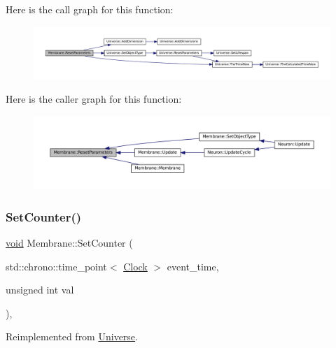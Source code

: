Here is the call graph for this function\+:\nopagebreak
\begin{figure}[H]
\begin{center}
\leavevmode
\includegraphics[width=350pt]{class_membrane_a9c49462cf63495381a52e2defc80b1e4_cgraph}
\end{center}
\end{figure}
Here is the caller graph for this function\+:\nopagebreak
\begin{figure}[H]
\begin{center}
\leavevmode
\includegraphics[width=350pt]{class_membrane_a9c49462cf63495381a52e2defc80b1e4_icgraph}
\end{center}
\end{figure}
\mbox{\label{class_membrane_a4bff43b38d7046867f220392a39cc272}} 
\subsubsection{\texorpdfstring{Set\+Counter()}{SetCounter()}}
{\footnotesize\ttfamily \mbox{\hyperlink{glad_8h_a950fc91edb4504f62f1c577bf4727c29}{void}} Membrane\+::\+Set\+Counter (\begin{DoxyParamCaption}\item[{std\+::chrono\+::time\+\_\+point$<$ \mbox{\hyperlink{universe_8h_a0ef8d951d1ca5ab3cfaf7ab4c7a6fd80}{Clock}} $>$}]{event\+\_\+time,  }\item[{unsigned int}]{val }\end{DoxyParamCaption})\hspace{0.3cm}{\ttfamily [inline]}, {\ttfamily [virtual]}}



Reimplemented from \mbox{\hyperlink{class_universe_aa22202ae740eb1355529afcb13285e91}{Universe}}.



